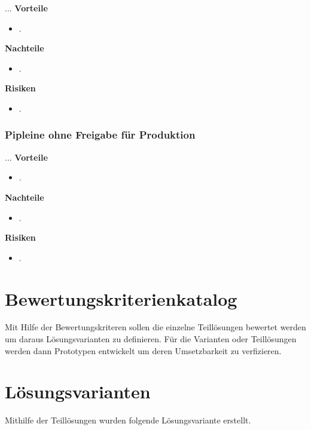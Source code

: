 ...\newline
\newline
\textbf{Vorteile}
\begin{itemize}
	\item .
\end{itemize}
\textbf{Nachteile}
\begin{itemize}
	\item .
\end{itemize}
\textbf{Risiken}
\begin{itemize}
	\item .
\end{itemize}

\subsubsection{Pipleine ohne Freigabe für Produktion}

...\newline
\newline
\textbf{Vorteile}
\begin{itemize}
	\item .
\end{itemize}
\textbf{Nachteile}
\begin{itemize}
	\item .
\end{itemize}
\textbf{Risiken}
\begin{itemize}
	\item .
\end{itemize}


\section{Bewertungskriterienkatalog}

Mit Hilfe der Bewertungskriteren sollen die einzelne Teillösungen bewertet werden um daraus Lösungsvarianten zu definieren. Für die Varianten oder Teillösungen werden dann Prototypen entwickelt um deren Umsetzbarkeit zu verfizieren.

\section{Lösungsvarianten}

Mithilfe der Teillösungen wurden folgende Lösungsvariante erstellt. 




